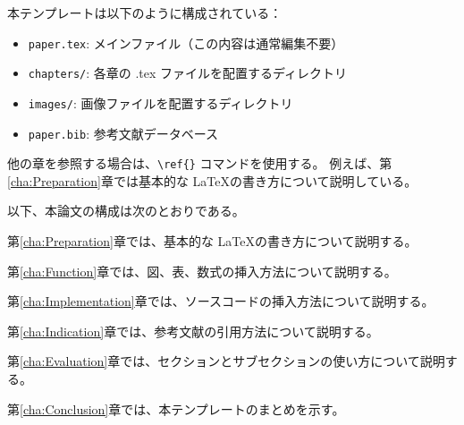 本テンプレートは以下のように構成されている：
\begin{itemize}
  \item \verb|paper.tex|: メインファイル（この内容は通常編集不要）
  \item \verb|chapters/|: 各章の .tex ファイルを配置するディレクトリ
  \item \verb|images/|: 画像ファイルを配置するディレクトリ
  \item \verb|paper.bib|: 参考文献データベース
\end{itemize}


他の章を参照する場合は、\verb|\ref{}| コマンドを使用する。
例えば、第\ref{cha:Preparation}章では基本的な \LaTeX の書き方について説明している。


以下、本論文の構成は次のとおりである。

第\ref{cha:Preparation}章では、基本的な \LaTeX の書き方について説明する。

第\ref{cha:Function}章では、図、表、数式の挿入方法について説明する。

第\ref{cha:Implementation}章では、ソースコードの挿入方法について説明する。

第\ref{cha:Indication}章では、参考文献の引用方法について説明する。

第\ref{cha:Evaluation}章では、セクションとサブセクションの使い方について説明する。

第\ref{cha:Conclusion}章では、本テンプレートのまとめを示す。
\fi
